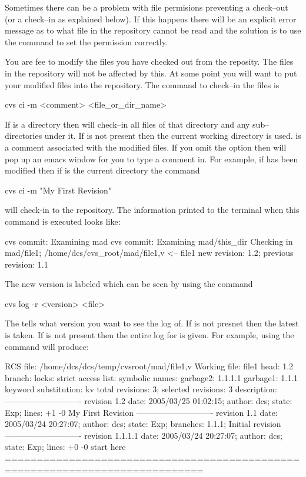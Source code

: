 Sometimes there can be a problem with file permisions preventing a
check--out (or a check--in as explained below). If this happens there
will be an explicit error message as to what file in the repository
cannot be read and the solution is to use the  command to
set the permission correctly.

You are fee to modify the files you have checked out from the
reposity. The files in the repository will not be affected by this.
At some point you will want to put your modified files into the
repository. The command to check--in the files is
\begin{example}
  cvs ci -m <comment> <file_or_dir_name>
\end{example}
If  is a directory then \cvs will check--in all
files of that directory and any sub--directories under it. If
 is not present then the current working
directory is used.  is a comment associated with the
modified files. If you omit the  option then \cvs
will pop up an emacs window for you to type a comment in.
For example, if  has been modified
then if  is the current directory the command
\begin{example}
  cvs ci -m "My First Revision"
\end{example}
will check-in  to the repository. The information printed to
the terminal when this command is executed looks like:
\begin{example}
  cvs commit: Examining mad
  cvs commit: Examining mad/this_dir
  Checking in mad/file1;
  /home/dcs/cvs_root/mad/file1,v  <--  file1
  new revision: 1.2; previous revision: 1.1
\end{example}
The new version is labeled  which can be seen by using the command
\begin{example}
  cvs log -r <version> <file>
\end{example}
The  tells \cvs what version you want to see the log
of. If  is not presnet then the latest is taken. If
 is not present then the entire log for  is
given. For example, using the command  will produce:
\begin{example}
  RCS file: /home/dcs/dcs/temp/cvsroot/mad/file1,v
  Working file: file1
  head: 1.2
  branch:
  locks: strict
  access list:
  symbolic names:
          garbage2: 1.1.1.1
          garbage1: 1.1.1
  keyword substitution: kv
  total revisions: 3;     selected revisions: 3
  description:
  ----------------------------
  revision 1.2
  date: 2005/03/25 01:02:15;  author: dcs;  state: Exp;  lines: +1 -0
  My First Revision
  ----------------------------
  revision 1.1
  date: 2005/03/24 20:27:07;  author: dcs;  state: Exp;
  branches:  1.1.1;
  Initial revision
  ----------------------------
  revision 1.1.1.1
  date: 2005/03/24 20:27:07;  author: dcs;  state: Exp;  lines: +0 -0
  start here
  =============================================================================
\end{example}
